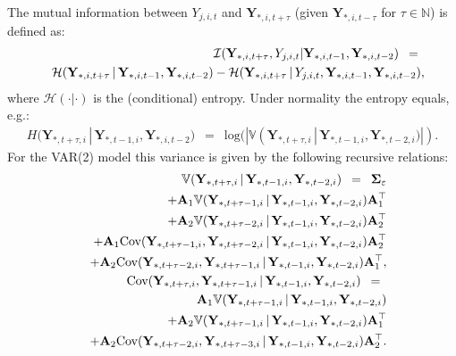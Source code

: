 \newpage
The mutual information between $Y_{j,i,t}$ and $\mathbf{Y}_{\ast,i,t+\tau}$ (given $\mathbf{Y}_{*,i,t-\tau}$ for $\tau \in \mathbb{N}$) is defined as:
\begin{eqnarray*}
& & \hspace{-1cm} \mathcal{I}(\mathbf{Y}_{\ast,i,t+\tau},Y_{j,i,t}|\mathbf{Y}_{*,i,t-1},\mathbf{Y}_{*,i,t-2}) \, \, \, = \, \, \,
\\
& & \mathcal{H}(\mathbf{Y}_{*,i,t+\tau} \, | \, \mathbf{Y}_{*,i,t-1},\mathbf{Y}_{*,i,t-2}) - \mathcal{H}(\mathbf{Y}_{*,i,t+\tau} \, | \, Y_{j,i,t},\mathbf{Y}_{*,i,t-1},\mathbf{Y}_{*,i,t-2}),
\end{eqnarray*}
where $\mathcal{H}(\cdot|\cdot)$ is the (conditional) entropy. Under normality the entropy equals, e.g.:
\begin{eqnarray*}
H(\mathbf{Y}_{\ast,t+\tau,i} \, |  \, \mathbf{Y}_{\ast,t-1,i},\mathbf{Y}_{*,i,t-2})  \, \, \, = \, \, \, \textrm{log}(|\mathbb{V}(\mathbf{Y}_{\ast,t+\tau, i} \, | \, \mathbf{Y}_{\ast,t-1,i}, \mathbf{Y}_{\ast,t-2,i})|).
\end{eqnarray*}
For the VAR(2) model this variance is given by the following recursive relations:
\begin{eqnarray*}
& & \hspace{-1.0cm}  \mathbb{V}(\mathbf{Y}_{\ast, t + \tau, i} \, | \, \mathbf{Y}_{\ast, t -1, i}, \mathbf{Y}_{\ast, t -2, i}) \, \, \,  = \, \, \,  \mathbf{\Sigma}_{\varepsilon}
\\
& & + \mathbf{A}_1 \mathbb{V}(\mathbf{Y}_{\ast, t + \tau -1, i}  \, | \, \mathbf{Y}_{\ast, t -1, i}, \mathbf{Y}_{\ast, t -2, i}) \mathbf{A}_1^{\top}
\\
& & + \mathbf{A}_2 \mathbb{V}(\mathbf{Y}_{\ast, t + \tau -2, i}  \, | \, \mathbf{Y}_{\ast, t -1, i}, \mathbf{Y}_{\ast, t -2, i}) \mathbf{A}_2^{\top}
\\
&  & + \mathbf{A}_1 \mbox{Cov}(\mathbf{Y}_{\ast, t + \tau -1, i}, \mathbf{Y}_{\ast, t + \tau -2, i}  \, | \, \mathbf{Y}_{\ast, t -1, i}, \mathbf{Y}_{\ast, t -2, i}) \mathbf{A}_2^{\top}
\\
&  & + \mathbf{A}_2 \mbox{Cov}(\mathbf{Y}_{\ast, t + \tau -2, i}, \mathbf{Y}_{\ast, t + \tau -1, i}  \, | \, \mathbf{Y}_{\ast, t -1, i}, \mathbf{Y}_{\ast, t -2, i}) \mathbf{A}_1^{\top},
\\
& & \hspace{-1.0cm}
\mbox{Cov}(\mathbf{Y}_{\ast, t + \tau, i}, \mathbf{Y}_{\ast, t + \tau-1, i} \, | \, \mathbf{Y}_{\ast, t -1, i}, \mathbf{Y}_{\ast, t -2, i}) \, \, \, = \, \, \,
\\
&  & \mathbf{A}_1 \mathbb{V}(\mathbf{Y}_{\ast, t + \tau -1, i}  \, | \, \mathbf{Y}_{\ast, t -1, i}, \mathbf{Y}_{\ast, t -2, i})
\\
& & + \mathbf{A}_2 \mathbb{V}(\mathbf{Y}_{\ast, t + \tau -1, i}  \, | \, \mathbf{Y}_{\ast, t -1, i}, \mathbf{Y}_{\ast, t -2, i}) \mathbf{A}_1^{\top}
\\
&  & + \mathbf{A}_2 \mbox{Cov}(\mathbf{Y}_{\ast, t + \tau -2, i}, \mathbf{Y}_{\ast, t + \tau -3, i}  \, | \, \mathbf{Y}_{\ast, t -1, i}, \mathbf{Y}_{\ast, t -2, i}) \mathbf{A}_2^{\top}.
\end{eqnarray*}
